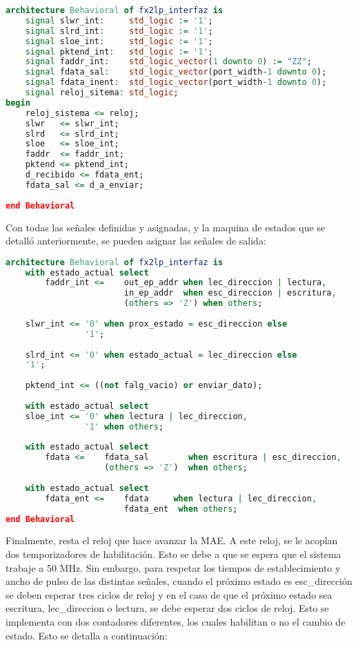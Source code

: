 \begin{lstlisting}[language=VHDL,backgroundcolor=\color{gray!30}]
architecture Behavioral of fx2lp_interfaz is
	signal slwr_int:  	 std_logic := '1';
	signal slrd_int:  	 std_logic := '1';
	signal sloe_int:  	 std_logic := '1';
	signal pktend_int:	 std_logic := '1';
	signal faddr_int:	 std_logic_vector(1 downto 0) := "ZZ";
	signal fdata_sal:	 std_logic_vector(port_width-1 downto 0);
	signal fdata_inent:	 std_logic_vector(port_width-1 downto 0);
	signal reloj_sitema: std_logic;
begin
	reloj_sistema <= reloj;
	slwr   <= slwr_int;
	slrd   <= slrd_int;
	sloe   <= sloe_int;
	faddr  <= faddr_int;
	pktend <= pktend_int;
	d_recibido <= fdata_ent;
	fdata_sal <= d_a_enviar;
	
end Behavioral
\end{lstlisting}

Con todas las señales definidas y asignadas, y la maquina de estados que se detalló anteriormente, se pueden asignar las señales de salida:

\begin{lstlisting}[language=VHDL,backgroundcolor=\color{gray!30}]
architecture Behavioral of fx2lp_interfaz is
	with estado_actual select
		faddr_int <=	out_ep_addr when lec_direccion | lectura,
						in_ep_addr  when esc_direccion | escritura,
						(others => 'Z') when others;
	
	slwr_int <=	'0' when prox_estado = esc_direccion else
				'1';
	
	slrd_int <= '0' when estado_actual = lec_direccion else
	'1';
	
	pktend_int <= ((not falg_vacio) or enviar_dato);
	
	with estado_actual select
	sloe_int <=	'0' when lectura | lec_direccion,
				'1' when others;
	
	with estado_actual select
		fdata <=	fdata_sal        when escritura | esc_direccion,
					(others => 'Z')  when others;
	
	with estado_actual select
		fdata_ent <=	fdata     when lectura | lec_direccion,
						fdata_ent  when others;
end Behavioral
\end{lstlisting}

Finalmente, resta el reloj que hace avanzar la MAE. A este reloj, se le acoplan dos temporizadores de habilitación. Esto se debe a que se espera que el sistema trabaje a 50 MHz. Sin embargo, para respetar los tiempos de establecimiento y ancho de pulso de las distintas señales\cite{Cypress2017}, cuando el próximo estado es esc\_dirección se deben esperar tres ciclos de reloj y en el caso de que el próximo estado sea escritura, lec\_direccion o lectura, se debe esperar dos ciclos de reloj.
Esto se implementa con dos contadores diferentes, los cuales habilitan o no el cambio de estado. Esto se detalla a continuación:

